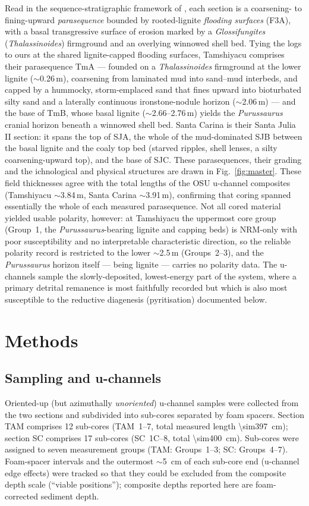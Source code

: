 \documentclass[11pt]{article}
\begin{document}
Read in the sequence-stratigraphic framework of \citet{Gingras2002}, each section
is a coarsening- to fining-upward \emph{parasequence} bounded by rooted-lignite
\emph{flooding surfaces} (F3A), with a basal transgressive surface of erosion
marked by a \textit{Glossifungites} (\textit{Thalassinoides}) firmground and an
overlying winnowed shell bed. Tying the \citet{Gingras2002} logs to ours at the
shared lignite-capped flooding surfaces, Tamshiyacu comprises their parasequence TmA
--- founded on a \textit{Thalassinoides} firmground at the lower lignite ($\sim$0.26\,m),
coarsening from laminated mud into sand--mud interbeds, and capped by a hummocky,
storm-emplaced sand that fines upward into bioturbated silty sand and a laterally
continuous ironstone-nodule horizon ($\sim$2.06\,m) --- and the base of TmB, whose
basal lignite ($\sim$2.66--2.76\,m) yields the \textit{Purussaurus} cranial horizon
beneath a winnowed shell bed. Santa Carina is their Santa Julia II section: it spans the
top of SJA, the whole of the mud-dominated SJB between the basal lignite and the coaly
top bed (starved ripples, shell lenses, a silty coarsening-upward top), and the base of
SJC. These parasequences, their grading and the ichnological and physical structures
are drawn in Fig.~\ref{fig:master}. These field thicknesses agree with the total lengths of the OSU u-channel
composites (Tamshiyacu $\sim$3.84\,m, Santa Carina $\sim$3.91\,m), confirming that
coring spanned essentially the whole of each measured parasequence. Not all cored
material yielded usable polarity, however: at Tamshiyacu the uppermost core group
(Group~1, the \textit{Purussaurus}-bearing lignite and capping beds) is
NRM-only with poor susceptibility and no interpretable characteristic direction,
so the reliable polarity record is restricted to the lower $\sim$2.5\,m
(Groups~2--3), and the \textit{Purussaurus} horizon itself --- being lignite ---
carries no polarity data. The u-channels sample the slowly-deposited, lowest-energy
part of the system, where a primary detrital remanence is most faithfully recorded
but which is also most susceptible to the reductive diagenesis (pyritisation)
documented below.

\section{Methods}

\subsection{Sampling and u-channels}
Oriented-up (but azimuthally \emph{unoriented}) u-channel samples were collected
from the two sections and subdivided into sub-cores separated by foam spacers.
Section TAM comprises 12 sub-cores (TAM~1--7, total measured length
\SI{\sim397}{\centi\meter}); section SC comprises 17 sub-cores (SC~1C--8, total
\SI{\sim400}{\centi\meter}). Sub-cores were assigned to seven measurement groups
(TAM: Groups~1--3; SC: Groups~4--7). Foam-spacer intervals and the outermost
$\sim$\SI{5}{\centi\meter} of each sub-core end (u-channel edge effects) were
tracked so that they could be excluded from the composite depth scale
(``viable positions''); composite depths reported here are foam-corrected
sediment depth.
\end{document}
